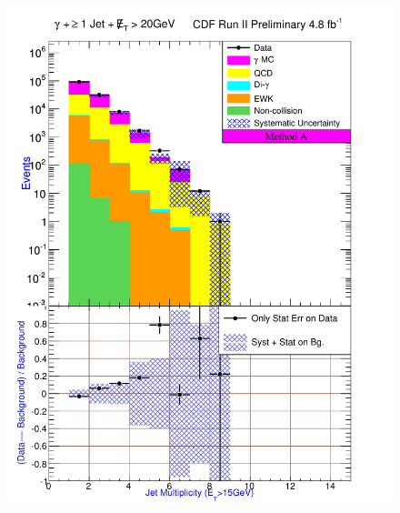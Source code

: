 \documentclass[12pt,twoside,letterpaper,doublespace]{article}
\begin{document}
\begin{figure}[h!]
{\includegraphics[keepaspectratio=true, scale=\figScale]{G30JetsMet20_MtdA_plot1_NJet.pdf}}

\end{figure}
\end{document}
